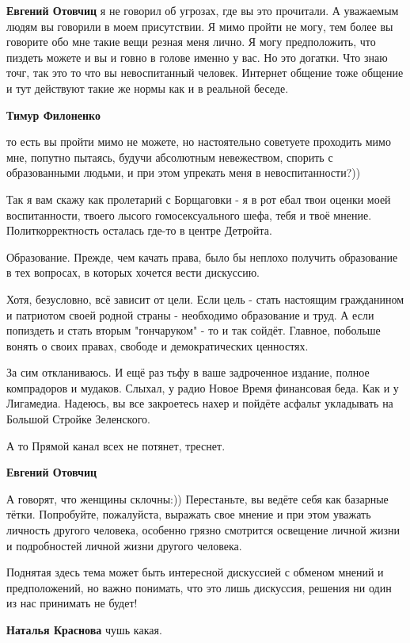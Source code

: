 \begin{itemize}
\begin{itemize}
\textbf{Евгений Отовчиц} я не говорил об угрозах, где вы это прочитали. А уважаемым людям вы говорили в моем присутствии. Я мимо пройти не могу, тем более вы говорите обо мне такие вещи резная меня лично. Я могу предположить, что пиздеть можете и вы и говно в голове именно у вас. Но это догатки. Что знаю точг, так это то что вы невоспитанный человек. Интернет общение тоже общение и тут действуют такие же нормы как и в реальной беседе.

\textbf{Тимур Филоненко} 

то есть вы пройти мимо не можете, но настоятельно советуете проходить мимо мне,
попутно пытаясь, будучи абсолютным невежеством, спорить с образованными людьми,
и при этом упрекать меня в невоспитанности?))

Так я вам скажу как пролетарий с Борщаговки - я в рот ебал твои оценки моей
воспитанности, твоего лысого гомосексуального шефа, тебя и твоё мнение.
Политкорректность осталась где-то в центре Детройта.

Образование. Прежде, чем качать права, было бы неплохо получить образование в
тех вопросах, в которых хочется вести дискуссию.

Хотя, безусловно, всё зависит от цели. Если цель - стать настоящим гражданином
и патриотом своей родной страны - необходимо образование и труд. А если
попиздеть и стать вторым "гончаруком" - то и так сойдёт. Главное, побольше
вонять о своих правах, свободе и демократических ценностях.

За сим откланиваюсь. И ещё раз тьфу в ваше задроченное издание, полное
компрадоров и мудаков. Слыхал, у радио Новое Время финансовая беда. Как и у
Лигамедиа. Надеюсь, вы все закроетесь нахер и пойдёте асфальт укладывать на
Большой Стройке Зеленского.

А то Прямой канал всех не потянет, треснет.

\textbf{Евгений Отовчиц} 

А говорят, что женщины склочны:)) Перестаньте, вы ведёте себя как базарные
тётки. Попробуйте, пожалуйста, выражать свое мнение и при этом уважать личность
другого человека, особенно грязно смотрится освещение личной жизни и
подробностей личной жизни другого человека.

Поднятая здесь тема может быть интересной дискуссией с обменом мнений и
предположений, но важно понимать, что это лишь дискуссия, решения ни один из
нас принимать не будет!

\textbf{Наталья Краснова} чушь какая.


\end{itemize}
\end{itemize}
